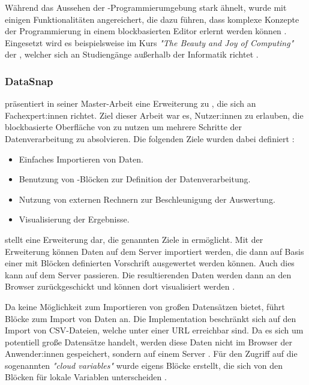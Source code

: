 Während das Aussehen der \Snap{}-Programmierumgebung \Scratch{} stark ähnelt, wurde \Snap{} mit einigen Funktionalitäten angereichert, die dazu führen, dass komplexe Konzepte der Programmierung in einem blockbasierten Editor erlernt werden können \parencite{ballSnapLook2019}. Eingesetzt wird es beispielsweise im Kurs \textit{"The Beauty and Joy of Computing"} der \citeauthor{universityofcaliforniaberkeleyBeautyJoy}, welcher sich an Studiengänge außerhalb der Informatik richtet \parencite{universityofcaliforniaberkeleySnapBuild}.

\subsubsection{DataSnap}
\citeauthor{hellmannDataSnapEnabling2015} präsentiert in seiner Master-Arbeit eine Erweiterung zu \Snap{}, die sich an Fachexpert:innen richtet. Ziel dieser Arbeit war es, Nutzer:innen zu erlauben, die blockbasierte Oberfläche von \Snap{} zu nutzen um mehrere Schritte der Datenverarbeitung zu absolvieren. Die folgenden Ziele wurden dabei definiert \parencite{hellmannDataSnapEnabling2015}:

\begin{itemize}
  \item Einfaches Importieren von Daten.
  \item Benutzung von \Snap{}-Blöcken zur Definition der Datenverarbeitung.
  \item Nutzung von externen Rechnern zur Beschleunigung der Auswertung.
  \item Visualisierung der Ergebnisse.
\end{itemize}

\DataSnap{} stellt eine Erweiterung dar, die genannten Ziele in \Snap{} ermöglicht. Mit der Erweiterung können Daten auf dem Server importiert werden, die dann auf Basis einer mit Blöcken definierten Vorschrift ausgewertet werden können. Auch dies kann auf dem Server passieren. Die resultierenden Daten werden dann an den Browser zurückgeschickt und können dort visualisiert werden \parencite{hellmannDataSnapEnabling2015}.

Da \Snap{} keine Möglichkeit zum Importieren von großen Datensätzen bietet, führt \DataSnap{} Blöcke zum Import von Daten an. Die Implementation beschränkt sich auf den Import von \acs{CSV}-Dateien, welche unter einer URL erreichbar sind. Da es sich um potentiell große Datensätze handelt, werden diese Daten nicht im Browser der Anwender:innen gespeichert, sondern auf einem Server \parencite{hellmannDataSnapEnabling2015}. Für den Zugriff auf die sogenannten \textit{"cloud variables"} wurde eigens Blöcke erstellt, die sich von den Blöcken für lokale Variablen unterscheiden \parencite{hellmannDataSnapEnabling2015}.

